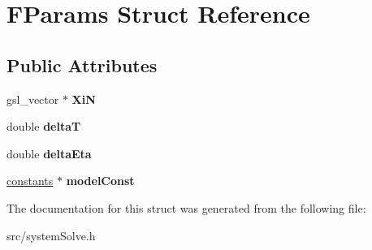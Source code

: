 \hypertarget{structFParams}{
\section{FParams Struct Reference}
\label{structFParams}
}
\subsection*{Public Attributes}
\begin{DoxyCompactItemize}
\item 
\hypertarget{structFParams_abf2e0595af66a5282a7cfc0a9e9d7a9f}{
gsl\_\-vector $\ast$ {\bfseries XiN}}
\label{structFParams_abf2e0595af66a5282a7cfc0a9e9d7a9f}

\item 
\hypertarget{structFParams_a60254daf4ee837252884402b9a2653d0}{
double {\bfseries deltaT}}
\label{structFParams_a60254daf4ee837252884402b9a2653d0}

\item 
\hypertarget{structFParams_ad53d99b185bdeb67f5b74e19b0596d82}{
double {\bfseries deltaEta}}
\label{structFParams_ad53d99b185bdeb67f5b74e19b0596d82}

\item 
\hypertarget{structFParams_a9ad4892b4290ef6ab958f273ff174b27}{
\hyperlink{structconstants}{constants} $\ast$ {\bfseries modelConst}}
\label{structFParams_a9ad4892b4290ef6ab958f273ff174b27}

\end{DoxyCompactItemize}


The documentation for this struct was generated from the following file:\begin{DoxyCompactItemize}
\item 
src/systemSolve.h\end{DoxyCompactItemize}
